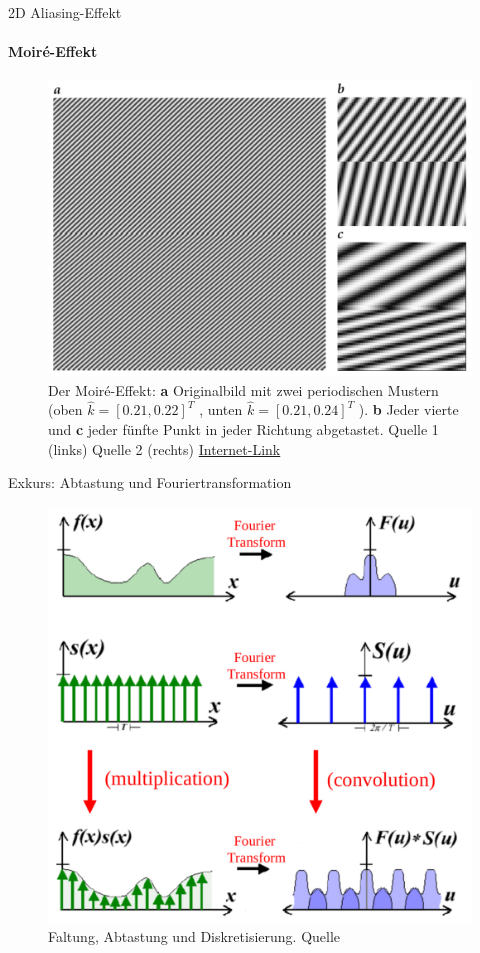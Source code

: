 \documentclass{beamer}
\begin{document}
	\begin{frame}{2D Aliasing-Effekt}
	\framesubtitle{Moiré-Effekt}
	\begin{figure}
		\includegraphics[width=0.7\textheight]{moire.pdf}
		\caption{\footnotesize Der Moiré-Effekt: \textbf{a} Originalbild mit zwei periodischen Mustern (oben $\hat{k} = [0.21, 0.22]^T$ , unten $\hat{k} = [0.21, 0.24]^T$ ). \textbf{b} Jeder vierte und \textbf{c} jeder fünfte Punkt in jeder	Richtung abgetastet. Quelle 1 (links)\cite{bildverarbeitung} Quelle 2 (rechts) \href{https://upload.wikimedia.org/wikipedia/en/4/42/Moir\%C3\%A9.gif}{Internet-Link}}
	\end{figure}
	\end{frame}

	\begin{frame}{Exkurs: Abtastung und Fouriertransformation}
		\begin{figure}
			\includegraphics[width=0.7\textheight]{fourier.pdf}
			\caption{\footnotesize Faltung, Abtastung und Diskretisierung. Quelle\cite{mit}}
		\end{figure}
	\end{frame}
\end{document}
